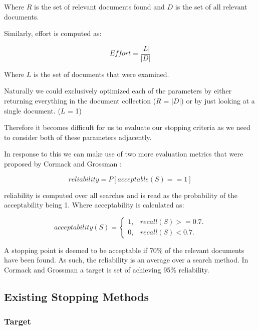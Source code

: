 Where $R$ is the set of relevant documents found and $D$ is the set of all relevant documents.

Similarly, effort is computed as:

\begin{equation}
Effort = \frac{|L|}{|D|}
\end{equation}

Where $L$ is the set of documents that were examined.

Naturally we could exclusively optimized each of the parameters by either returning everything in the document collection ($R$ = $|D|$) or by just looking at a single document. ($L$ = 1)

Therefore it becomes difficult for us to evaluate our stopping criteria as we need to consider both of these parameters adjacently.

In response to this we can make use of two more evaluation metrics that were proposed by Cormack and Grossman \cite{Cormack2016}:

\begin{equation}
reliability = P [acceptable(S) == 1]
\end{equation}

reliability is computed over all searches and is read as the probability of the acceptability being 1. Where acceptability is calculated as:

\begin{equation}
  acceptability(S)=\begin{cases}
    1, & \text{$recall(S)>=0.7$}.\\
    0, & \text{$recall(S)<0.7$}.
  \end{cases}
\end{equation}

A stopping point is deemed to be acceptable if 70\% of the relevant documents have been found. As such, the reliability is an average over a search method. In Cormack and Grossman \cite{Cormack2016} a target is set of achieving 95\% reliability.


\subsection{Existing Stopping Methods} \label{methods}


\subsubsection{Target} \label{target}

